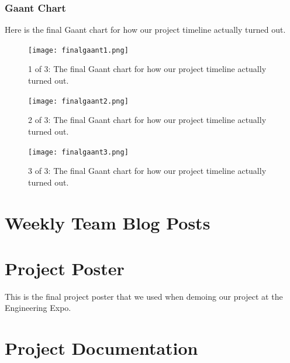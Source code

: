 \documentclass[12pt]{article}
\begin{document}
\subsubsection{Gaant Chart}
Here is the final Gaant chart for how our project timeline actually turned out.

\begin{figure}[h!]
  \centering
	\texttt{[image: finalgaant1.png]}
  \caption{1 of 3: The final Gaant chart for how our project timeline actually turned out.}
\end{figure}
\begin{figure}[h!]
  \centering
	\texttt{[image: finalgaant2.png]}
  \caption{2 of 3: The final Gaant chart for how our project timeline actually turned out.}
\end{figure}
\pagebreak

\begin{figure}[h!]
  \centering
	\texttt{[image: finalgaant3.png]}
  \caption{3 of 3: The final Gaant chart for how our project timeline actually turned out.}
\end{figure}
\pagebreak

\section{Weekly Team Blog Posts}

\pagebreak

\section{Project Poster}
This is the final project poster that we used when demoing our project at the Engineering Expo.




\section{Project Documentation}
\end{document}
